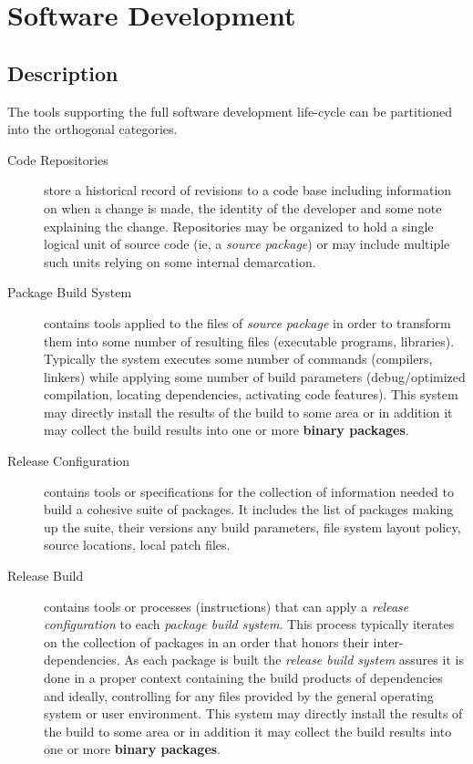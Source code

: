 \section{Software Development}

\subsection{Description}

The tools supporting the full software development life-cycle can be
partitioned into the orthogonal categories.

\begin{description}
\item[Code Repositories] store a historical record of revisions to a
  code base including information on when a change is made, the
  identity of the developer and some note explaining the change.
  Repositories may be organized to hold a single logical unit of
  source code (ie, a \textit{source package}) or may include multiple
  such units relying on some internal demarcation.

\item[Package Build System] contains tools applied to the files of
  \textit{source package} in order to transform them into some number
  of resulting files (executable programs, libraries).  Typically the
  system executes some number of commands (compilers, linkers) while
  applying some number of build parameters (debug/optimized
  compilation, locating dependencies, activating code features).  This
  system may directly install the results of the build to some area or
  in addition it may collect the build results into one or more
  \textbf{binary packages}.

\item[Release Configuration] contains tools or specifications for the
  collection of information needed to build a cohesive suite of
  packages.  It includes the list of packages making up the suite,
  their versions any build parameters, file system layout policy,
  source locations, local patch files.

\item[Release Build] contains tools or processes (instructions) that can
  apply a \textit{release configuration} to each \textit{package build
    system}.  This process typically iterates on the collection of
  packages in an order that honors their inter-dependencies.  As each
  package is built the \textit{release build system} assures it is
  done in a proper context containing the build products of
  dependencies and ideally, controlling for any files provided by the
  general operating system or user environment. This system may
  directly install the results of the build to some area or in
  addition it may collect the build results into one or more
  \textbf{binary packages}.


\end{description}
